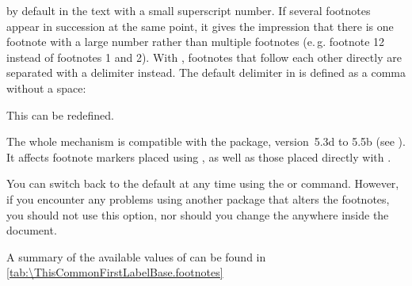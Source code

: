 \begin{Declaration}
\end{Declaration}
%
by default in the text with a small superscript number. If several footnotes
appear in succession at the same point, it gives the impression that there is
one footnote with a large number rather than multiple footnotes (e.\,g.
footnote 12 instead of footnotes 1 and 2).
With
, footnotes
that follow each other directly are separated with a delimiter instead. The
default delimiter in  is
defined as a comma without a space:
\begin{lstcode}
  \newcommand*{\multfootsep}{,}
\end{lstcode}
This can be redefined.

The whole mechanism is compatible with the 
package, version~5.3d to 5.5b (see \cite{package:footmisc}). It affects
footnote markers placed using 
, as well as 
those placed directly with 
.

You can switch back to the default 
 at any time using the 
 or
 command. However, if you
encounter any problems using another package that alters the footnotes, you
should not use this option, nor should you change the  anywhere
inside the document.

A summary of the available  values of  can
be found in \autoref{tab:\ThisCommonFirstLabelBase.footnotes}%
%
%
\EndIndexGroup


